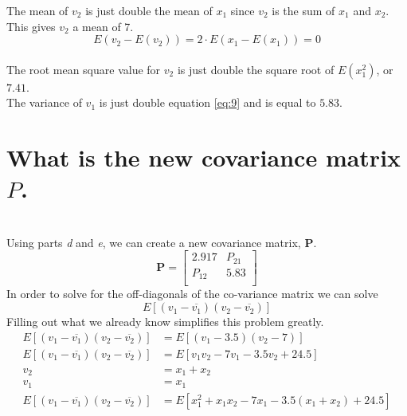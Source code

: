\documentclass[12pt,letterpaper, onecolumn]{exam}
\begin{document}
\begin{questions}
\begin{parts}
		        The mean of $v_2$ is just double the mean of $x_1$ since $v_2$ is the sum of $x_1$ and $x_2$. This gives $v_2$ a mean of 7.\\

		        \begin{equation}
		            E(v_2 - E(v_2)) = 2\cdot E(x_1 - E(x_1)) = 0
		        \end{equation}\\

		        The root mean square value for $v_2$ is just double the square root of $E(x_1^2)$, or $7.41$.\\

		        The variance of $v_1$ is just double equation \ref{eq:9} and is equal to $5.83$.\\
        \part{What is the new covariance matrix $P$.}\\
		        \solution
		        Using parts \textit{d} and \textit{e}, we can create a new covariance matrix, $\mathbf{P}$.
		        \begin{equation}
		            \mathbf{P} =
		            \begin{bmatrix}
		                2.917  & P_{21} \\
		                P_{12} & 5.83   \\
		            \end{bmatrix}
		        \end{equation}
		        In order to solve for the off-diagonals of the co-variance matrix we can solve
		        \[E\left[(v_1 - \overline{v_1})(v_2 - \overline{v_2}) \right] \]
		        Filling out what we already know simplifies this problem greatly.
		        \begin{equation}
		            \begin{split}
		                E\left[(v_1 - \overline{v_1})(v_2 - \overline{v_2}) \right] & = E\left[(v_1 - 3.5)(v_2 - 7) \right]\\
		                E\left[(v_1 - \overline{v_1})(v_2 - \overline{v_2}) \right] & = E\left[v_1v_2 - 7v_1 - 3.5v_2 + 24.5\right]\\
		                v_2 & = x_1 + x_2\\
		                v_1 & = x_1\\
		                E\left[(v_1 - \overline{v_1})(v_2 - \overline{v_2}) \right] & = E\left[x_1^2 + x_1x_2 - 7x_1 - 3.5(x_1 + x_2) + 24.5\right]\\

\end{split}
\end{equation}
\end{parts}
\end{questions}
\end{document}

